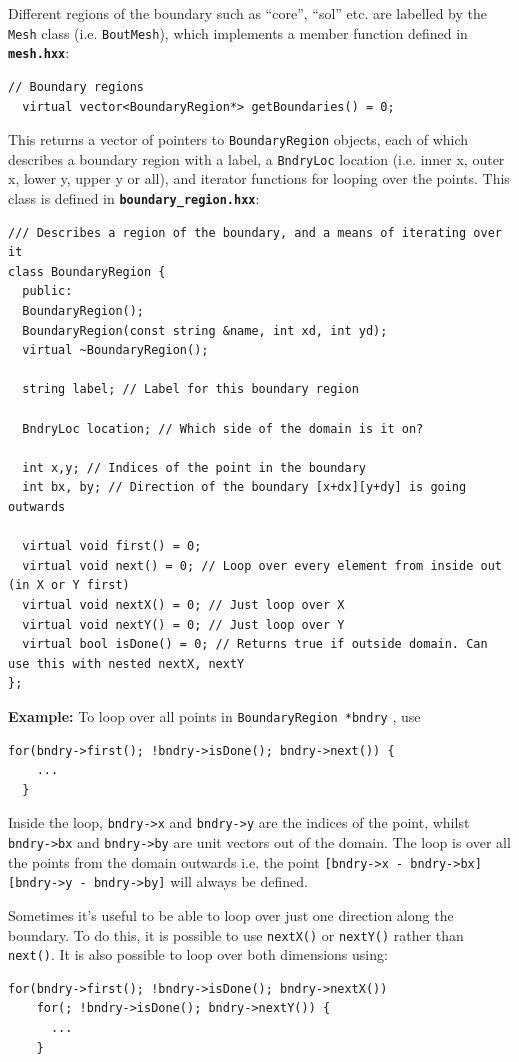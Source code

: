 \documentclass[12pt]{article}
\newcommand{\code}[1]{\texttt{#1}}
\newcommand{\file}[1]{\texttt{\bf #1}}
\begin{document}
Different regions of the boundary such as ``core'', ``sol'' etc. are
labelled by the \code{Mesh} class (i.e. \code{BoutMesh}), which
implements a member function defined in \file{mesh.hxx}:
\begin{lstlisting}[firstnumber=150]
  // Boundary regions
  virtual vector<BoundaryRegion*> getBoundaries() = 0;
\end{lstlisting}
This returns a vector of pointers to \code{BoundaryRegion} objects,
each of which describes a boundary region with a label, a \code{BndryLoc} 
location (i.e. inner x, outer x, lower y, upper y or all), and iterator
functions for looping over the points. This class is
defined in \file{boundary\_region.hxx}:
\begin{lstlisting}[firstnumber=12]
/// Describes a region of the boundary, and a means of iterating over it
class BoundaryRegion {
  public:
  BoundaryRegion();
  BoundaryRegion(const string &name, int xd, int yd);
  virtual ~BoundaryRegion();
  
  string label; // Label for this boundary region
  
  BndryLoc location; // Which side of the domain is it on?
  
  int x,y; // Indices of the point in the boundary
  int bx, by; // Direction of the boundary [x+dx][y+dy] is going outwards

  virtual void first() = 0;
  virtual void next() = 0; // Loop over every element from inside out (in X or Y first)
  virtual void nextX() = 0; // Just loop over X
  virtual void nextY() = 0; // Just loop over Y
  virtual bool isDone() = 0; // Returns true if outside domain. Can use this with nested nextX, nextY
};
\end{lstlisting}

{\bf Example:} To loop over all points in \code{BoundaryRegion *bndry} , use
\begin{lstlisting}[numbers=none]
  for(bndry->first(); !bndry->isDone(); bndry->next()) {
    ...
  }
\end{lstlisting}
Inside the loop, \code{bndry->x} and \code{bndry->y} are the indices
of the point, whilst \code{bndry->bx} and \code{bndry->by} are unit vectors
out of the domain. The loop is over all the points from the domain outwards 
i.e. the point
\code{[bndry->x - bndry->bx][bndry->y - bndry->by]} will always be defined.

Sometimes it's useful to be able to loop over just one direction along the
boundary. To do this, it is possible to use \code{nextX()} or \code{nextY()}
rather than \code{next()}. It is also possible to loop over both dimensions
using:
\begin{lstlisting}[numbers=none]
  for(bndry->first(); !bndry->isDone(); bndry->nextX())
    for(; !bndry->isDone(); bndry->nextY()) {
      ...
    }
\end{lstlisting}
\end{document}
